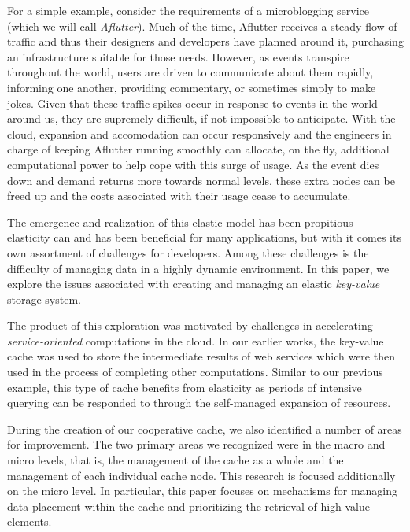 For a simple example, consider the requirements of a microblogging service
(which we will call \emph{Aflutter}). Much of the time, Aflutter receives a
steady flow of traffic and thus their designers and developers have planned
around it, purchasing an infrastructure suitable for those needs. However, as
events transpire throughout the world, users are driven to communicate about
them rapidly, informing one another, providing commentary, or sometimes simply
to make jokes. Given that these traffic spikes occur in response to events in
the world around us, they are supremely difficult, if not impossible to
anticipate. With the cloud, expansion and accomodation can occur responsively
and the engineers in charge of keeping Aflutter running smoothly can allocate,
on the fly, additional computational power to help cope with this surge of
usage. As the event dies down and demand returns more towards normal levels,
these extra nodes can be freed up and the costs associated with their usage
cease to accumulate.

The emergence and realization of this elastic model has been propitious --
elasticity can and has been beneficial for many applications, but with it comes
its own assortment of challenges for developers. Among these challenges is the
difficulty of managing data in a highly dynamic environment. In this paper, we
explore the issues associated with creating and managing an elastic
\emph{key-value} storage system.

The product of this exploration was motivated by challenges in accelerating
\emph{service-oriented} computations in the cloud. In our earlier works, the
key-value cache was used to store the intermediate results of web services
which were then used in the process of completing other computations.  Similar
to our previous example, this type of cache benefits from elasticity as periods
of intensive querying can be responded to through the self-managed expansion of
resources.

During the creation of our cooperative cache, we also identified a number of
areas for improvement. The two primary areas we recognized were in the macro
and micro levels, that is, the management of the cache as a whole and the
management of each individual cache node. This research is focused additionally
on the micro level. In particular, this paper focuses on mechanisms for
managing data placement within the cache and prioritizing the retrieval of
high-value elements.

